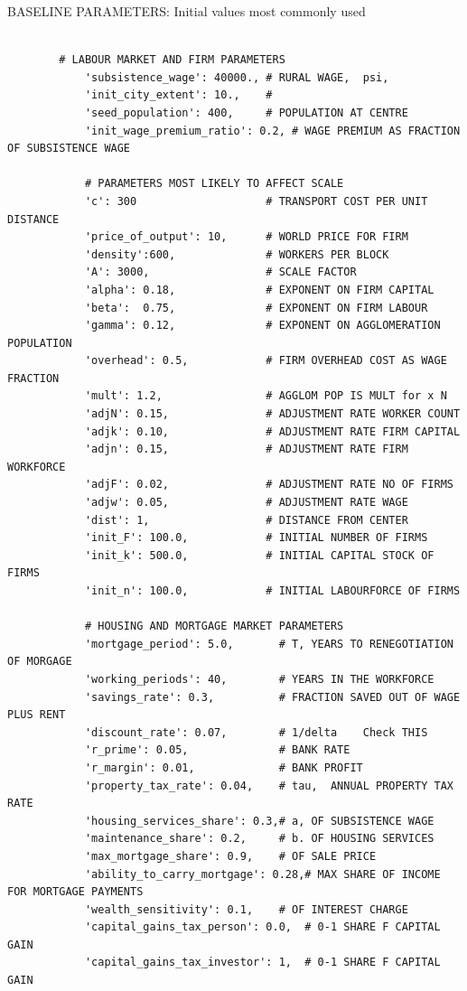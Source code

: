 {\tiny
BASELINE PARAMETERS: Initial values most commonly used 
\begin{verbatim}

        # LABOUR MARKET AND FIRM PARAMETERS
            'subsistence_wage': 40000., # RURAL WAGE,  psi, 
            'init_city_extent': 10.,    # 
            'seed_population': 400,     # POPULATION AT CENTRE
            'init_wage_premium_ratio': 0.2, # WAGE PREMIUM AS FRACTION OF SUBSISTENCE WAGE

            # PARAMETERS MOST LIKELY TO AFFECT SCALE
            'c': 300                    # TRANSPORT COST PER UNIT DISTANCE
            'price_of_output': 10,      # WORLD PRICE FOR FIRM
            'density':600,              # WORKERS PER BLOCK  
            'A': 3000,                  # SCALE FACTOR 
            'alpha': 0.18,              # EXPONENT ON FIRM CAPITAL
            'beta':  0.75,              # EXPONENT ON FIRM LABOUR
            'gamma': 0.12,              # EXPONENT ON AGGLOMERATION POPULATION
            'overhead': 0.5,            # FIRM OVERHEAD COST AS WAGE FRACTION
            'mult': 1.2,                # AGGLOM POP IS MULT for x N
            'adjN': 0.15,               # ADJUSTMENT RATE WORKER COUNT
            'adjk': 0.10,               # ADJUSTMENT RATE FIRM CAPITAL
            'adjn': 0.15,               # ADJUSTMENT RATE FIRM WORKFORCE
            'adjF': 0.02,               # ADJUSTMENT RATE NO OF FIRMS
            'adjw': 0.05,               # ADJUSTMENT RATE WAGE
            'dist': 1,                  # DISTANCE FROM CENTER
            'init_F': 100.0,            # INITIAL NUMBER OF FIRMS
            'init_k': 500.0,            # INITIAL CAPITAL STOCK OF FIRMS
            'init_n': 100.0,            # INITIAL LABOURFORCE OF FIRMS

            # HOUSING AND MORTGAGE MARKET PARAMETERS
            'mortgage_period': 5.0,       # T, YEARS TO RENEGOTIATION OF MORGAGE
            'working_periods': 40,        # YEARS IN THE WORKFORCE
            'savings_rate': 0.3,          # FRACTION SAVED OUT OF WAGE PLUS RENT
            'discount_rate': 0.07,        # 1/delta    Check THIS
            'r_prime': 0.05,              # BANK RATE          
            'r_margin': 0.01,             # BANK PROFIT          
            'property_tax_rate': 0.04,    # tau,  ANNUAL PROPERTY TAX RATE
            'housing_services_share': 0.3,# a, OF SUBSISTENCE WAGE
            'maintenance_share': 0.2,     # b. OF HOUSING SERVICES
            'max_mortgage_share': 0.9,    # OF SALE PRICE
            'ability_to_carry_mortgage': 0.28,# MAX SHARE OF INCOME  FOR MORTGAGE PAYMENTS
            'wealth_sensitivity': 0.1,    # OF INTEREST CHARGE 
            'capital_gains_tax_person': 0.0,  # 0-1 SHARE F CAPITAL GAIN
            'capital_gains_tax_investor': 1,  # 0-1 SHARE F CAPITAL GAIN
    
\end{verbatim}
}
\newpage

